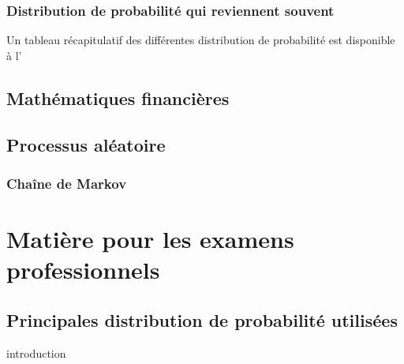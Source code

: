 \documentclass[12pt, french]{report}
\begin{document}
\section{Distribution de probabilité qui reviennent souvent}
Un tableau récapitulatif des différentes distribution de probabilité est disponible à l'


\chapter{Mathématiques financières}


\chapter{Processus aléatoire}

\section{Chaîne de Markov}
\label{sec:chaine-markov}



\part{Matière pour les examens professionnels}



\appendix
\chapter{Principales distribution de probabilité utilisées}
introduction
\end{document}
